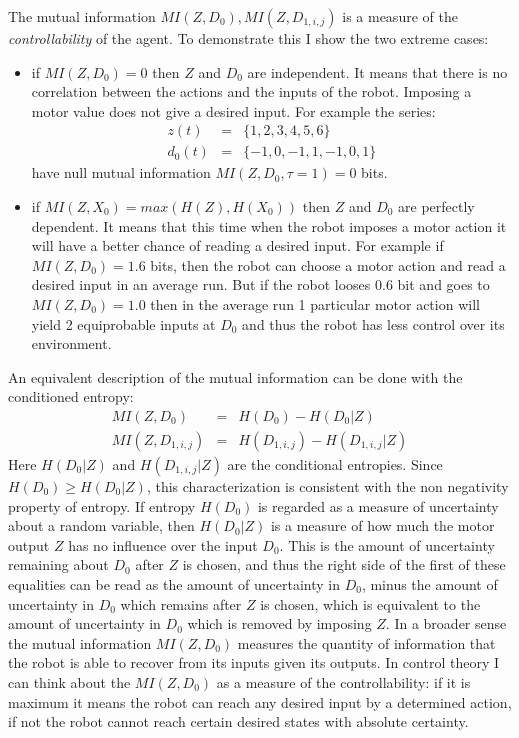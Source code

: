 The mutual information $MI(Z,D_0),MI(Z,D_{1,i,j})$ is a measure of the 
\textit{controllability} of the agent. To demonstrate this
I show the two extreme cases:
\begin{itemize}
\item if $MI(Z,D_0)=0$ then $Z$ and $D_0$ are independent.  It means
  that there is no correlation between the actions and the inputs of
  the robot.  Imposing a motor value does not give a desired input.
  For example the series:
 \begin{eqnarray}
z(t) & = &\{1, 2, 3, 4 ,5 ,6\}\\
d_{0}(t)& =&\{-1 ,0 ,-1, 1, -1 ,0, 1\}
\end{eqnarray}
have null mutual information $MI(Z,D_0,\tau=1)=0$ bits.
\item if $MI(Z,X_0)=max(H(Z),H(X_0))$ then $Z$ and $D_0$ are perfectly
  dependent.  It means that this time when the robot imposes a motor
  action it will have a better chance of reading a desired input.  For
  example if $MI(Z,D_0)=1.6$ bits, then the robot can choose a motor
  action and read a desired input in an average run.  But if the robot
  looses 0.6 bit and goes to $MI(Z,D_0)=1.0$ then in the average run 1
  particular motor action will yield 2 equiprobable inputs at $D_0$ and
  thus the robot has less control over its environment.
\end{itemize}
An equivalent description of the mutual information can be done with
the conditioned entropy:
\begin{eqnarray}
MI(Z,D_0) & = & H(D_0)-H(D_0|Z)\\
MI(Z,D_{1,i,j}) & = & H(D_{1,i,j})-H(D_{1,i,j}|Z)
\end{eqnarray}
Here $H(D_0|Z)$ and $H(D_{1,i,j}|Z)$ are the conditional entropies. 
Since $H(D_0)\geq H(D_0|Z)$,
this characterization is consistent with the non negativity property
of entropy. If entropy $H(D_0)$ is regarded as a measure of
uncertainty about a random variable, then $H(D_0|Z)$ is a measure of
how much the motor output $Z$ has no influence over the input $D_0$.
This is the amount of uncertainty remaining about $D_0$ after $Z$ is
chosen, and thus the right side of the first of these equalities can
be read as the amount of uncertainty in $D_0$, minus the amount of
uncertainty in $D_0$ which remains after $Z$ is chosen, which is
equivalent to the amount of uncertainty in $D_0$ which is removed by
imposing $Z$.  In a broader sense the mutual information $MI(Z,D_0)$
measures the quantity of information that the robot is able to recover
from its inputs given its outputs.  In control theory I can think
about the $MI(Z,D_0)$ as a measure of the controllability: if it is 
maximum it means the robot can reach any desired input by a determined
action, if not the robot cannot reach certain desired states with
absolute certainty.

